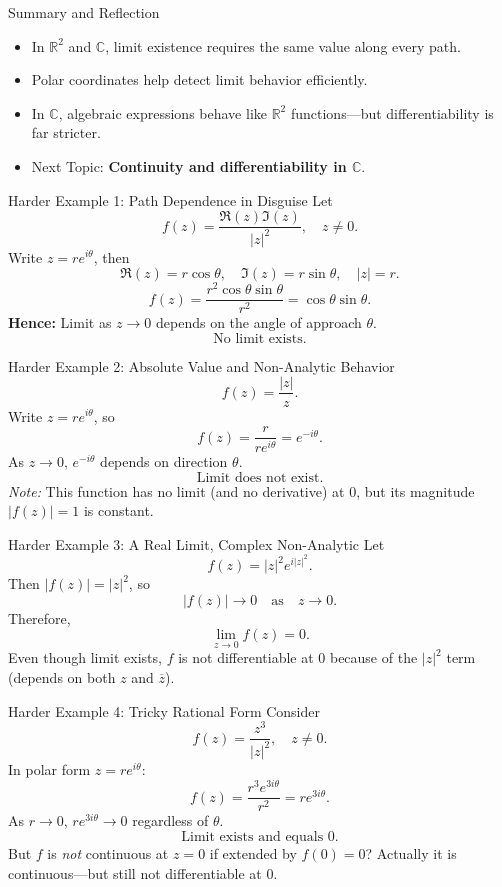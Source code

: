 \documentclass[11pt]{beamer}
\theoremstyle{plain}
\begin{document}
\begin{frame}{Summary and Reflection}
\begin{itemize}
    \item In \(\mathbb{R}^2\) and \(\mathbb{C}\), limit existence requires the same value along every path.
    \item Polar coordinates help detect limit behavior efficiently.
    \item In \(\mathbb{C}\), algebraic expressions behave like \(\mathbb{R}^2\) functions—but differentiability is far stricter.
    \item Next Topic: \textbf{Continuity and differentiability in \(\mathbb{C}\)}.
\end{itemize}
\end{frame}

\begin{frame}{Harder Example 1: Path Dependence in Disguise}
Let
\[
    f(z) = \frac{\Re(z)\Im(z)}{|z|^2}, \quad z \neq 0.
\]
\pause
Write \(z = re^{i\theta}\), then
\[
    \Re(z)=r\cos\theta, \quad \Im(z)=r\sin\theta, \quad |z|=r.
\]
\[
    f(z) = \frac{r^2\cos\theta\sin\theta}{r^2} = \cos\theta \sin\theta.
\]
\pause
\textbf{Hence:} Limit as \(z\to0\) depends on the angle of approach \(\theta\).  
\[
\boxed{\text{No limit exists.}}
\]
\end{frame}

\begin{frame}{Harder Example 2: Absolute Value and Non-Analytic Behavior}
\[
    f(z) = \frac{|z|}{z}.
\]
\pause
Write \(z = re^{i\theta}\), so
\[
    f(z) = \frac{r}{re^{i\theta}} = e^{-i\theta}.
\]
\pause
As \(z\to 0\), \(e^{-i\theta}\) depends on direction \(\theta\).\\
\[
\boxed{\text{Limit does not exist.}}
\]
\pause
\textit{Note:} This function has no limit (and no derivative) at 0, but its magnitude \(|f(z)|=1\) is constant.
\end{frame}

\begin{frame}{Harder Example 3: A Real Limit, Complex Non-Analytic}
Let
\[
    f(z) = |z|^2 e^{i|z|^2}.
\]
\pause
Then \(|f(z)| = |z|^2\), so
\[
    |f(z)| \to 0 \quad \text{as} \quad z\to 0.
\]
\pause
Therefore,
\[
\boxed{\lim_{z\to0} f(z) = 0.}
\]
Even though limit exists, \(f\) is not differentiable at \(0\) because of the \(|z|^2\) term (depends on both \(z\) and \(\overline{z}\)).
\end{frame}

\begin{frame}{Harder Example 4: Tricky Rational Form}
Consider
\[
    f(z) = \frac{z^3}{|z|^2}, \quad z\neq 0.
\]
\pause
In polar form \(z=re^{i\theta}\):
\[
    f(z) = \frac{r^3 e^{3i\theta}}{r^2} = r e^{3i\theta}.
\]
\pause
As \(r\to 0\), \(r e^{3i\theta}\to 0\) regardless of \(\theta\).
\[
\boxed{\text{Limit exists and equals } 0.}
\]
\pause
But \(f\) is \emph{not} continuous at \(z=0\) if extended by \(f(0)=0\)?  
Actually it is continuous—but still not differentiable at \(0\).
\end{frame}
\end{document}
